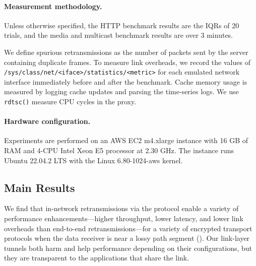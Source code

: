 \paragraph{Measurement methodology.}

Unless otherwise specified, the HTTP benchmark results are the IQRs of
20 trials, and the media and multicast benchmark results are over 3 minutes.

We define spurious retransmissions as the number of packets sent by the server
containing duplicate frames. To measure link overheads, we record the values
of \texttt{/sys/class/net/<iface>/statistics/<metric>} for each emulated
network interface immediately before and after the benchmark. Cache memory
usage is measured by logging cache updates and parsing the time-series logs. We
use \texttt{rdtsc()} measure CPU cycles in the proxy.


\paragraph{Hardware configuration.}

Experiments are performed on an AWS EC2 m4.xlarge instance with 16 GB of RAM
and 4-CPU Intel Xeon E5 processor at 2.30 GHz. The instance
runs Ubuntu 22.04.2 LTS with the Linux 6.80-1024-aws kernel.

\subsection{Main Results}

We find that
in-network retransmissions via the \Sys protocol enable a variety of performance
enhancements---higher throughput, lower latency, and lower link overheads than
end-to-end retransmissions---for a variety of encrypted transport protocols
when the data receiver is near a lossy path segment ().
Our link-layer tunnels both harm and help performance depending on their
configurations, but they are transparent to the applications that share the link.

